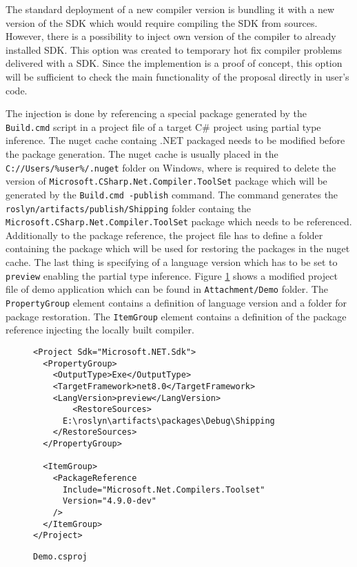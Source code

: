 The standard deployment of a new compiler version is bundling it with a new version of the SDK which would require compiling the SDK from sources.
However, there is a possibility to inject own version of the compiler to already installed SDK.
This option was created to temporary hot fix compiler problems delivered with a SDK.
Since the implemention is a proof of concept, this option will be sufficient to check the main functionality of the proposal directly in user's code.
\par
The injection is done by referencing a special package generated by the \texttt{Build.cmd} script in a project file of a target C\# project using partial type inference.
The nuget cache containg .NET packaged needs to be modified before the package generation.
The nuget cache is usually placed in the \texttt{C://Users/\%user\%/.nuget} folder on Windows, where is required to delete the version of \texttt{Microsoft.CSharp.Net.Compiler.ToolSet} package which will be generated by the \texttt{Build.cmd -publish} command.
The command generates the \texttt{roslyn/artifacts/publish/Shipping} folder containg the \texttt{Microsoft.CSharp.Net.Compiler.ToolSet} package which needs to be referenced.
Additionally to the package reference, the project file has to define a folder containing the package which will be used for restoring the packages in the nuget cache.
The last thing is specifying of a language version which has to be set to \texttt{preview} enabling the partial type inference. 
Figure \ref{img68:csproj} shows a modified project file of demo application which can be found in \texttt{Attachment/Demo} folder.
The \texttt{PropertyGroup} element contains a definition of language version and a folder for package restoration.
The \texttt{ItemGroup} element contains a definition of the package reference injecting the locally built compiler. 
\begin{figure}[h]
\begin{lstlisting}
<Project Sdk="Microsoft.NET.Sdk">
  <PropertyGroup>
    <OutputType>Exe</OutputType>
    <TargetFramework>net8.0</TargetFramework>
    <LangVersion>preview</LangVersion>
        <RestoreSources>
      E:\roslyn\artifacts\packages\Debug\Shipping
    </RestoreSources>
  </PropertyGroup>

  <ItemGroup>
    <PackageReference 
      Include="Microsoft.Net.Compilers.Toolset" 
      Version="4.9.0-dev"
    />
  </ItemGroup>
</Project>
\end{lstlisting}
\caption{\texttt{Demo.csproj}}
\label{img68:csproj}
\end{figure}
